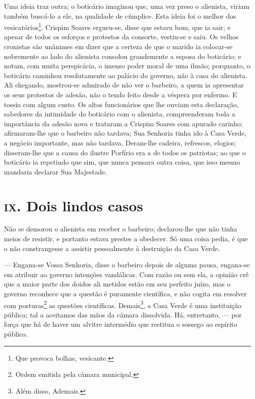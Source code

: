 Uma ideia traz outra; o boticário imaginou que, uma vez preso o
alienista, viriam também buscá-lo a ele, na qualidade de cúmplice. Esta
ideia foi o melhor dos vesicatórios\footnote{Que provoca bolhas,
  vesicante.}. Crispim Soares ergueu-se, disse que estava bom, que ia
sair; e apesar de todos os esforços e protestos da consorte, vestiu-se e
saiu. Os velhos cronistas são unânimes em dizer que a certeza de que o
marido ia colocar-se nobremente ao lado do alienista consolou
grandemente a esposa do boticário; e notam, com muita perspicácia, o
imenso poder moral de uma ilusão; porquanto, o boticário caminhou
resolutamente ao palácio do governo, não à casa do alienista. Ali
chegando, mostrou-se admirado de não ver o barbeiro, a quem ia
apresentar os seus protestos de adesão, não o tendo feito desde a
véspera por enfermo. E tossia com algum custo. Os altos funcionários que
lhe ouviam esta declaração, sabedores da intimidade do boticário com o
alienista, compreenderam toda a importância da adesão nova e trataram a
Crispim Soares com apurado carinho; afirmaram-lhe que o barbeiro não
tardava; Sua Senhoria tinha ido à Casa Verde, a negócio importante, mas
não tardava. Deram-lhe cadeira, refrescos, elogios; disseram-lhe que a
causa do ilustre Porfírio era a de todos os patriotas; ao que o
boticário ia repetindo que sim, que nunca pensara outra coisa, que isso
mesmo mandaria declarar Sua Majestade.

\section*{\textsc{ix}. Dois lindos casos }

Não se demorou o alienista em receber o barbeiro; declarou-lhe que não
tinha meios de resistir, e portanto estava prestes a obedecer. Só uma
coisa pedia, é que o não constrangesse a assistir pessoalmente à
destruição da Casa Verde.

--- Engana-se Vossa Senhoria, disse o barbeiro depois de alguma pausa,
engana-se em atribuir ao governo intenções vandálicas. Com razão ou sem
ela, a opinião crê que a maior parte dos doidos ali metidos estão em seu
perfeito juízo, mas o governo reconhece que a questão é puramente
científica, e não cogita em resolver com posturas\footnote{Ordem emitida
  pela câmara municipal.} as questões científicas. Demais\footnote{Além
  disso, Ademais.}, a Casa Verde é uma instituição pública; tal a
aceitamos das mãos da câmara dissolvida. Há, entretanto, --- por força
que há de haver um alvitre intermédio que restitua o sossego ao espírito
público.

